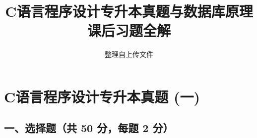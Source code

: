 \documentclass[12pt,a4paper]{article}
\title{\textbf{C语言程序设计专升本真题与数据库原理课后习题全解}}
\author{整理自上传文件}
\date{}
\begin{document}
\maketitle
\tableofcontents
\newpage

\section{C语言程序设计专升本真题 (一)}
\subsection*{一、选择题（共 50 分，每题 2 分）}
\end{document}
